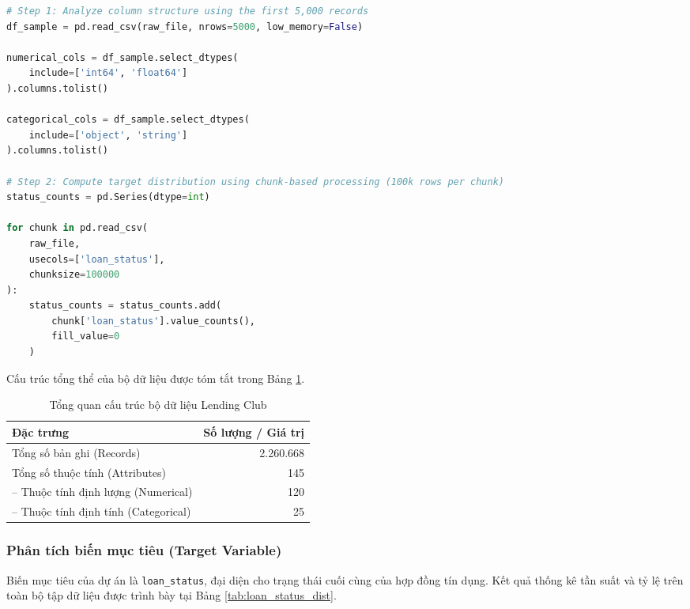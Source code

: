 \begin{lstlisting}[language=Python, caption=Python Code for Dataset Overview and Target Distribution Analysis]
# Step 1: Analyze column structure using the first 5,000 records
df_sample = pd.read_csv(raw_file, nrows=5000, low_memory=False)

numerical_cols = df_sample.select_dtypes(
    include=['int64', 'float64']
).columns.tolist()

categorical_cols = df_sample.select_dtypes(
    include=['object', 'string']
).columns.tolist()

# Step 2: Compute target distribution using chunk-based processing (100k rows per chunk)
status_counts = pd.Series(dtype=int)

for chunk in pd.read_csv(
    raw_file,
    usecols=['loan_status'],
    chunksize=100000
):
    status_counts = status_counts.add(
        chunk['loan_status'].value_counts(),
        fill_value=0
    )
\end{lstlisting}
Cấu trúc tổng thể của bộ dữ liệu được tóm tắt trong Bảng \ref{tab:dataset_summary}.

\begin{table}[H]
    \centering
    \renewcommand{\arraystretch}{1.2}
    \begin{tabular}{|l|r|}
        \hline
        \textbf{Đặc trưng} & \textbf{Số lượng / Giá trị} \\ \hline
        Tổng số bản ghi (Records) & 2.260.668 \\ \hline
        Tổng số thuộc tính (Attributes) & 145 \\ \hline
        -- Thuộc tính định lượng (Numerical) & 120 \\ \hline
        -- Thuộc tính định tính (Categorical) & 25 \\ \hline
    \end{tabular}
    \caption{Tổng quan cấu trúc bộ dữ liệu Lending Club}
    \label{tab:dataset_summary}
\end{table}

\subsubsection{Phân tích biến mục tiêu (Target Variable)}
Biến mục tiêu của dự án là \texttt{loan\_status}, đại diện cho trạng thái cuối cùng của hợp đồng tín dụng. Kết quả thống kê tần suất và tỷ lệ trên toàn bộ tập dữ liệu được trình bày tại Bảng \ref{tab:loan_status_dist}.

